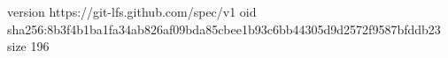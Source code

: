 version https://git-lfs.github.com/spec/v1
oid sha256:8b3f4b1ba1fa34ab826af09bda85cbee1b93c6bb44305d9d2572f9587bfddb23
size 196
